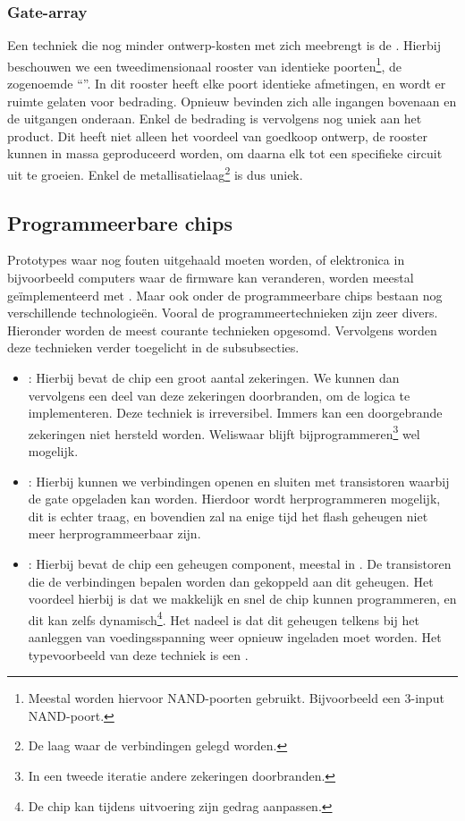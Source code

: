 \subsubsection{Gate-array}
Een techniek die nog minder ontwerp-kosten met zich meebrengt is de . Hierbij beschouwen we een tweedimensionaal rooster van identieke poorten\footnote{Meestal worden hiervoor NAND-poorten gebruikt. Bijvoorbeeld een 3-input NAND-poort.}, de zogenoemde ``''. In dit rooster heeft elke poort identieke afmetingen, en wordt er ruimte gelaten voor bedrading. Opnieuw bevinden zich alle ingangen bovenaan en de uitgangen onderaan. Enkel de bedrading is vervolgens nog uniek aan het product. Dit heeft niet alleen het voordeel van goedkoop ontwerp, de rooster kunnen in massa geproduceerd worden, om daarna elk tot een specifieke circuit uit te groeien. Enkel de metallisatielaag\footnote{De laag waar de verbindingen gelegd worden.} is dus uniek.
\subsection{Programmeerbare chips}
\label{ss:programmeerbareChips}
Prototypes waar nog fouten uitgehaald moeten worden, of elektronica in bijvoorbeeld computers waar de firmware kan veranderen, worden meestal ge\"implementeerd met . Maar ook onder de programmeerbare chips bestaan nog verschillende technologie\"en. Vooral de programmeertechnieken zijn zeer divers. Hieronder worden de meest courante technieken opgesomd. Vervolgens worden deze technieken verder toegelicht in de subsubsecties.
\begin{itemize}
 \item {}: Hierbij bevat de chip een groot aantal zekeringen. We kunnen dan vervolgens een deel van deze zekeringen doorbranden, om de logica te implementeren. Deze techniek is irreversibel. Immers kan een doorgebrande zekeringen niet hersteld worden. Weliswaar blijft bijprogrammeren\footnote{In een tweede iteratie andere zekeringen doorbranden.} wel mogelijk.%
 \item {}: Hierbij kunnen we verbindingen openen en sluiten met transistoren waarbij de gate opgeladen kan worden. Hierdoor wordt herprogrammeren mogelijk, dit is echter traag, en bovendien zal na enige tijd het flash geheugen niet meer herprogrammeerbaar zijn.
 \item {}: Hierbij bevat de chip een geheugen component, meestal in . De transistoren die de verbindingen bepalen worden dan gekoppeld aan dit geheugen. Het voordeel hierbij is dat we makkelijk en snel de chip kunnen programmeren, en dit kan zelfs dynamisch\footnote{De chip kan tijdens uitvoering zijn gedrag aanpassen.}. Het nadeel is dat dit geheugen telkens bij het aanleggen van voedingsspanning weer opnieuw ingeladen moet worden. Het typevoorbeeld van deze techniek is een .
\end{itemize}
